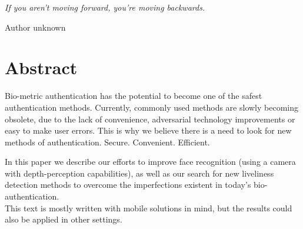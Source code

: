 \begin{flushright}
    \textit{If you aren't moving forward, you're moving backwards.}

    Author unknown %
\end{flushright}


\section*{Abstract}
Bio-metric authentication has the potential to become
one of the safest authentication methods. 
Currently, commonly used methods are slowly becoming obsolete,
due to the lack of convenience, adversarial technology
improvements or easy to make user errors.
This is why we believe there is a need to look for
new methods of authentication. Secure. Convenient. Efficient.\par
\bigskip


In this paper we describe our efforts to improve face recognition
(using a camera with depth-perception capabilities), as well as
our search for new liveliness detection methods to overcome
the imperfections existent in today's bio-authentication.\\
This text is mostly written with mobile solutions in mind,
but the results could also be applied in other settings.
